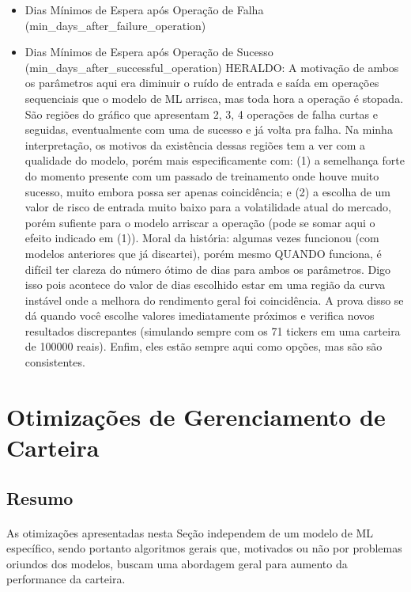 \begin{itemize}
    \item Dias Mínimos de Espera após Operação de Falha (min\_days\_after\_failure\_operation)
    \item Dias Mínimos de Espera após Operação de Sucesso (min\_days\_after\_successful\_operation)
    \color{red} HERALDO: A motivação de ambos os parâmetros aqui era diminuir o ruído de entrada e saída em operações sequenciais que o modelo de ML arrisca, mas toda hora a operação é stopada. São regiões do gráfico que apresentam 2, 3, 4 operações de falha curtas e seguidas, eventualmente com uma de sucesso e já volta pra falha. Na minha interpretação, os motivos da existência dessas regiões tem a ver com a qualidade do modelo, porém mais especificamente com: (1) a semelhança forte do momento presente com um passado de treinamento onde houve muito sucesso, muito embora possa ser apenas coincidência; e (2) a escolha de um valor de risco de entrada muito baixo para a volatilidade atual do mercado, porém sufiente para o modelo arriscar a operação (pode se somar aqui o efeito indicado em (1)). Moral da história: algumas vezes funcionou (com modelos anteriores que já discartei), porém mesmo QUANDO funciona, é difícil ter clareza do número ótimo de dias para ambos os parâmetros. Digo isso pois acontece do valor de dias escolhido estar em uma região da curva instável onde a melhora do rendimento geral foi coincidência. A prova disso se dá quando você escolhe valores imediatamente próximos e verifica novos resultados discrepantes (simulando sempre com os 71 tickers em uma carteira de 100000 reais). Enfim, eles estão sempre aqui como opções, mas são são consistentes. 


\end{itemize}



\section{Otimizações de Gerenciamento de Carteira}

\subsection{Resumo}

\paragraph{} As otimizações apresentadas nesta Seção independem de um modelo de ML específico, sendo portanto algoritmos gerais que, motivados ou não por problemas oriundos dos modelos, buscam uma abordagem geral para aumento da performance da carteira.

